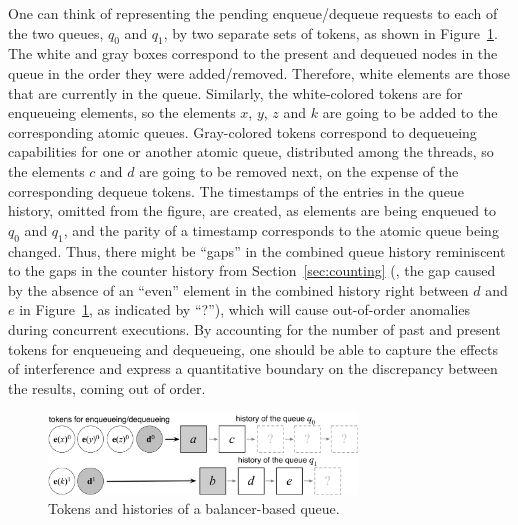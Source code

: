 %
One can think of representing the pending enqueue/dequeue requests to
each of the two queues, $q_0$ and $q_1$, by two separate sets of
tokens, as shown in Figure~\ref{fig:chist2}.
%
The white and gray boxes correspond to the present and
dequeued nodes in the queue in the order they were added/removed.
%
Therefore, white elements are those that are currently in the queue.
%
Similarly, the white-colored tokens are for enqueueing elements, so
the elements $x$, $y$, $z$ and $k$ are going to be added to the
corresponding atomic queues. Gray-colored tokens correspond to
dequeueing capabilities for one or another atomic queue, distributed
among the threads, so the elements $c$ and $d$ are going to be removed
next, on the expense of the corresponding dequeue tokens.
%
The timestamps of the entries in the queue history, omitted from the
figure, are created, as elements are being enqueued to $q_0$ and
$q_1$, and the parity of a timestamp corresponds to the atomic queue
being changed. Thus, there might be ``gaps'' in the combined queue
history reminiscent to the gaps in the counter history from
Section~\ref{sec:counting} (\eg, the gap caused by the absence of an
``even'' element in the combined history right between $d$ and $e$ in
Figure~\ref{fig:chist2}, as indicated by ``?''), which will cause
out-of-order anomalies during concurrent executions.
%
%
By accounting for the number of past and present tokens for enqueueing
and dequeueing, one should be able to capture the effects of
interference and express a quantitative boundary on the discrepancy
between the results, coming out of order.

{
\setlength{\belowcaptionskip}{-10pt}
\begin{figure}[t]
\centering
\includegraphics[width=8.2cm]{chist2.pdf}      
\caption{Tokens and histories of a balancer-based queue.}
\label{fig:chist2}
\end{figure}
}



